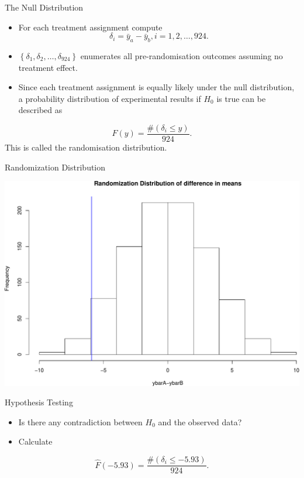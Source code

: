 \documentclass[10pt,ignorenonframetext,]{beamer}
\providecommand{\tightlist}{%
\setlength{\itemsep}{0pt}\setlength{\parskip}{0pt}}
\begin{document}
\begin{frame}{The Null Distribution}

\begin{itemize}
\tightlist
\item
  For each treatment assignment compute
  \[\delta_i={\bar y}_a-{\bar y}_b, i=1,2,\ldots,924.\]
\item
  \(\left\{\delta_1, \delta_2, \ldots, \delta_{924}\right\}\) enumerates
  all pre-randomisation outcomes assuming no treatment effect.
\item
  Since each treatment assignment is equally likely under the null
  distribution, a probability distribution of experimental results if
  \(H_0\) is true can be described as
\end{itemize}

\[{\hat F}(y)=\frac{\#(\delta_i \le y)}{924}.\] This is called the
randomisation distribution.

\end{frame}

\begin{frame}{Randomization Distribution}

\includegraphics{class3slides-jan16_files/figure-beamer/unnamed-chunk-7-1.pdf}

\end{frame}

\begin{frame}{Hypothesis Testing}

\begin{itemize}
\tightlist
\item
  Is there any contradiction between \(H_0\) and the observed data?
\item
  Calculate
\end{itemize}

\[{\hat F}(-5.93)=\frac{\#(\delta_i \le -5.93)}{924}.\]

\end{frame}
\end{document}
